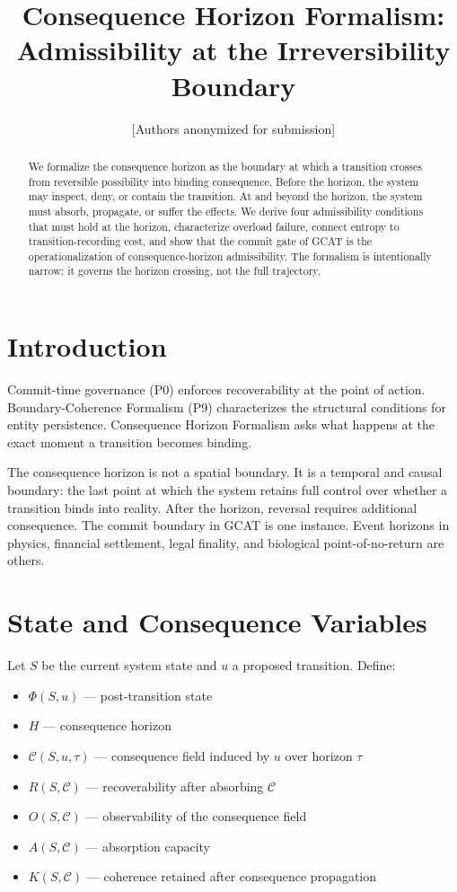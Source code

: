 \documentclass[letterpaper,10pt,conference]{ieeeconf}
\title{\bf Consequence Horizon Formalism: Admissibility at the Irreversibility Boundary}
\author{[Authors anonymized for submission]}
\newcommand{\Phiop}{\Phi}
\newcommand{\Cf}{\mathcal{C}}
\newcommand{\Rec}{R}
\newcommand{\Obs}{O}
\newcommand{\Abs}{A}
\newcommand{\Koh}{K}
\begin{document}
\maketitle
\thispagestyle{empty}
\pagestyle{empty}

\begin{abstract}
We formalize the consequence horizon as the boundary at which a transition crosses from reversible possibility into binding consequence. Before the horizon, the system may inspect, deny, or contain the transition. At and beyond the horizon, the system must absorb, propagate, or suffer the effects. We derive four admissibility conditions that must hold at the horizon, characterize overload failure, connect entropy to transition-recording cost, and show that the commit gate of GCAT is the operationalization of consequence-horizon admissibility. The formalism is intentionally narrow: it governs the horizon crossing, not the full trajectory.
\end{abstract}

\section{Introduction}
Commit-time governance (P0) enforces recoverability at the point of action. Boundary-Coherence Formalism (P9) characterizes the structural conditions for entity persistence. Consequence Horizon Formalism asks what happens at the exact moment a transition becomes binding.

The consequence horizon is not a spatial boundary. It is a temporal and causal boundary: the last point at which the system retains full control over whether a transition binds into reality. After the horizon, reversal requires additional consequence. The commit boundary in GCAT is one instance. Event horizons in physics, financial settlement, legal finality, and biological point-of-no-return are others.

\section{State and Consequence Variables}

Let $S$ be the current system state and $u$ a proposed transition. Define:
\begin{itemize}
\item $\Phiop(S, u)$ --- post-transition state
\item $H$ --- consequence horizon
\item $\Cf(S,u,\tau)$ --- consequence field induced by $u$ over horizon $\tau$
\item $\Rec(S,\Cf)$ --- recoverability after absorbing $\Cf$
\item $\Obs(S,\Cf)$ --- observability of the consequence field
\item $\Abs(S,\Cf)$ --- absorption capacity
\item $\Koh(S,\Cf)$ --- coherence retained after consequence propagation
\end{itemize}
\end{document}
